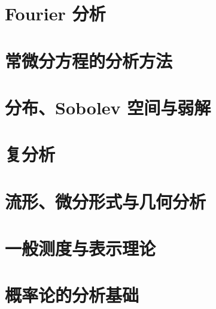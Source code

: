 \documentclass[UTF8,zihao=-4,openany,fontset=fandol]{ctexbook}
\begin{document}
\part{Fourier 分析}





\part{常微分方程的分析方法}



\part{分布、Sobolev 空间与弱解}



\part{复分析}









\part{流形、微分形式与几何分析}







\part{一般测度与表示理论}





\part{概率论的分析基础}








\appendix



\end{document}
